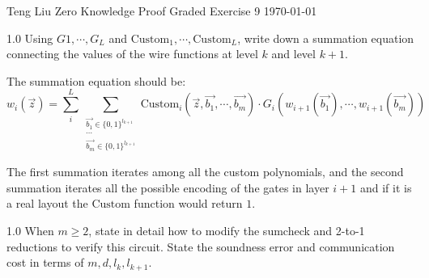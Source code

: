 \documentclass[12pt]{article}
\newenvironment{ex}[2][Exercise]{\begin{trivlist}
\item[\hskip \labelsep {\bfseries #1}\hskip \labelsep {\bfseries #2.}]\begin{spacing}{1.0}}{\end{spacing}\end{trivlist}}
\newenvironment{sol}[1][Solution]{\begin{trivlist}
\item[\hskip \labelsep {\bfseries #1:}]}{\end{trivlist}}
\begin{document}

\noindent Teng Liu \hfill {\Large Zero Knowledge Proof Graded Exercise 9} \hfill \today

\begin{ex}{1.a.1}
    Using $G1, \cdots, G_L$ and $\text{Custom}_1, \cdots , \text{Custom}_L$, write down a summation equation connecting the values of the wire functions at level $k$ and level $k+1$.
\end{ex}

\begin{sol}
    The summation equation should be:
    $$
        w_i(\vec{z}) = \sum_i^{L} \sum_{\substack{\vec{b_1} \in \{0,1\}^{l_{k+1}}\\
        \cdots\\
        \vec{b_m} \in \{0,1\}^{l_{k+1}}}}
        \text{Custom}_i(\vec{z}, \vec{b_1}, \cdots, \vec{b_m}) \cdot G_i(w_{i+1}(\vec{b_1}), \cdots, w_{i+1}(\vec{b_m}))
    $$

    The first summation iterates among all the custom polynomials, and the second summation iterates all the possible encoding of the gates in layer $i+1$ and if it is a real layout the $\text{Custom}$ function would return $1$.
\end{sol}

\begin{ex}{1.a.2}
    When $m \ge 2$, state in detail how to modify the sumcheck and 2-to-1 reductions to verify this circuit. State the soundness error and communication cost in terms of $m, d, l_k, l_{k+1}$.
\end{ex}
\end{document}
